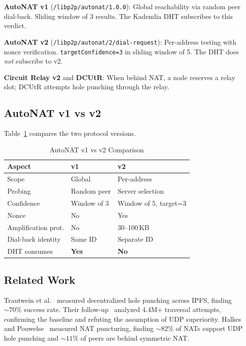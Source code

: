\documentclass[conference]{IEEEtran}
\begin{document}
\textbf{AutoNAT v1} (\texttt{/libp2p/autonat/1.0.0}): Global reachability via random peer dial-back. Sliding window of 3 results. The Kademlia DHT subscribes to this verdict.

\textbf{AutoNAT v2} (\texttt{/libp2p/autonat/2/dial-request}): Per-address testing with nonce verification. \texttt{targetConfidence=3} in sliding window of 5. The DHT does \emph{not} subscribe to v2.

\textbf{Circuit Relay v2} and \textbf{DCUtR}: When behind NAT, a node reserves a relay slot; DCUtR attempts hole punching through the relay.

\subsection{AutoNAT v1 vs v2}

Table~\ref{tab:v1v2} compares the two protocol versions.

\begin{table}[htbp]
\caption{AutoNAT v1 vs v2 Comparison}
\label{tab:v1v2}
\centering
\begin{tabular}{@{}lll@{}}
\toprule
Aspect & v1 & v2 \\
\midrule
Scope & Global & Per-address \\
Probing & Random peer & Server selection \\
Confidence & Window of 3 & Window of 5, target=3 \\
Nonce & No & Yes \\
Amplification prot. & No & 30--100\,KB \\
Dial-back identity & Same ID & Separate ID \\
DHT consumes & \textbf{Yes} & \textbf{No} \\
\bottomrule
\end{tabular}
\end{table}

\subsection{Related Work}

Trautwein et al.~\cite{trautwein2022} measured decentralized hole punching across IPFS, finding ${\sim}70\%$ success rate. Their follow-up~\cite{trautwein2025} analyzed 4.4M+ traversal attempts, confirming the baseline and refuting the assumption of UDP superiority. Halkes and Pouwelse~\cite{halkes2011} measured NAT puncturing, finding ${\sim}82\%$ of NATs support UDP hole punching and ${\sim}11\%$ of peers are behind symmetric NAT.
\end{document}
